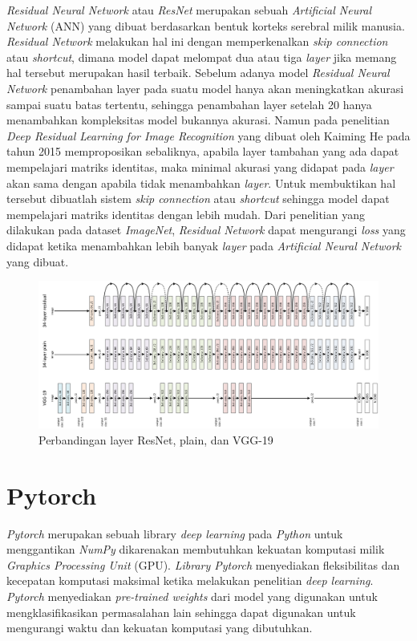 \textit{Residual Neural Network} atau \textit{ResNet} merupakan sebuah \textit{Artificial Neural Network} (ANN) yang dibuat berdasarkan bentuk korteks serebral milik manusia. \textit{Residual Network} melakukan hal ini dengan memperkenalkan \textit{skip connection} atau \textit{shortcut}, dimana model dapat melompat dua atau tiga \textit{layer} jika memang hal tersebut merupakan hasil terbaik. Sebelum adanya model \textit{Residual Neural Network} penambahan layer pada suatu model hanya akan meningkatkan akurasi sampai suatu batas tertentu, sehingga penambahan layer setelah 20 hanya menambahkan kompleksitas model bukannya akurasi. Namun pada penelitian \textit{Deep Residual Learning for Image Recognition} yang dibuat oleh Kaiming He pada tahun 2015 memproposikan sebaliknya, apabila layer tambahan yang ada dapat mempelajari matriks identitas, maka minimal akurasi yang didapat pada \textit{layer} akan sama dengan apabila tidak menambahkan \textit{layer}. Untuk membuktikan hal tersebut dibuatlah sistem \textit{skip connection} atau \textit{shortcut} sehingga model dapat mempelajari matriks identitas dengan lebih mudah. Dari penelitian yang dilakukan pada dataset \textit{ImageNet}, \textit{Residual Network} dapat mengurangi \textit{loss} yang didapat ketika menambahkan lebih banyak \textit{layer} pada \textit{Artificial Neural Network} yang dibuat. \cite{cit:10}

\begin{figure}[h!]
	\centering
	\includegraphics[scale=0.2]{img/ResNet.png}
	\caption{Perbandingan layer ResNet, plain, dan VGG-19 \cite{cit:10}}
	\label{fig:Resnet}
\end{figure}

\section{Pytorch}
\vspace{1ex}

\textit{Pytorch} merupakan sebuah library \textit{deep learning} pada \textit{Python} untuk menggantikan \textit{NumPy} dikarenakan membutuhkan kekuatan komputasi milik \textit{Graphics Processing Unit} (GPU). \textit{Library Pytorch} menyediakan fleksibilitas dan kecepatan komputasi maksimal ketika melakukan penelitian \textit{deep learning}. \textit{Pytorch} menyediakan \textit{pre-trained weights} dari model yang digunakan untuk mengklasifikasikan permasalahan lain sehingga dapat digunakan untuk mengurangi waktu dan kekuatan komputasi yang dibutuhkan. \cite{cit:11}
\vspace{1ex}

